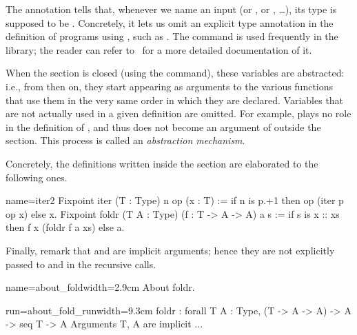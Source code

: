 The  annotation
tells \Coq{} that, whenever we name
an input  (or , or , \ldots), its type is supposed to be
.  Concretely, it lets us omit an explicit type annotation
in the definition of programs using , such as .
The   command is used frequently in the
\mcbMC{} library; the reader can refer to~\cite[section 2.7.18]{Coq:manual}
for a more detailed documentation of it.

When
the section is closed (using the  command), these variables
are abstracted: i.e., from then on, they start appearing as arguments
to the various functions that use them in the very same
order in which they are declared.
Variables that are not actually used
in a given definition are omitted. For example,  plays no
role in the definition of , and thus does not become an
argument of  outside the section.
This process %
is called
an {\em abstraction mechanism}.

Concretely, the definitions written inside the section are
elaborated to the following ones.

\begin{coq}{name=iter2}{}
Fixpoint iter (T : Type) n op (x : T) :=
  if n is p.+1 then op (iter p op x) else x.
Fixpoint foldr (T A : Type) (f : T -> A -> A) a s :=
  if s is x :: xs then f x (foldr f a xs) else a.
\end{coq}

Finally, remark that  and  are implicit arguments; hence they
are not explicitly passed to  and  in the recursive calls.
\begin{coq}{name=about_fold}{width=2.9cm}
About foldr.
$~$
\end{coq}
\begin{coqout}{run=about_fold_run}{width=9.3cm}
foldr : forall T A : Type, (T -> A -> A) -> A -> seq T -> A
Arguments T, A are implicit ...
\end{coqout}



